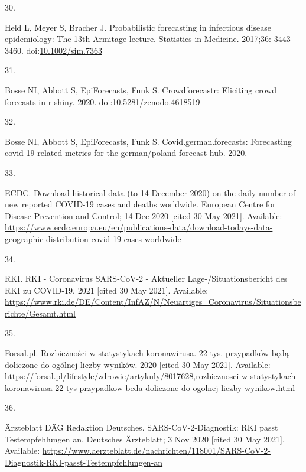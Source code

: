 \documentclass[10pt,letterpaper]{article}
\newlength{\cslhangindent}
\newlength{\csllabelwidth}
\newlength{\cslentryspacingunit} %
\newenvironment{CSLReferences}[2] %
 {%
  \setlength{\parindent}{0pt}
  \ifodd #1
  \let\oldpar\par
  \def\par{\hangindent=\cslhangindent\oldpar}
  \fi
  \setlength{\parskip}{#2\cslentryspacingunit}
 }%
 {}
\newcommand{\CSLLeftMargin}[1]{\parbox[t]{\csllabelwidth}{#1}}
\newcommand{\CSLRightInline}[1]{\parbox[t]{\linewidth - \csllabelwidth}{#1}\break}
\begin{document}
\begin{CSLReferences}{0}{0}
\leavevmode{}%
\CSLLeftMargin{30. }
\CSLRightInline{Held L, Meyer S, Bracher J. Probabilistic forecasting in
infectious disease epidemiology: The 13th {Armitage} lecture. Statistics
in Medicine. 2017;36: 3443--3460.
doi:\href{https://doi.org/10.1002/sim.7363}{10.1002/sim.7363}}

\leavevmode{}%
\CSLLeftMargin{31. }
\CSLRightInline{Bosse NI, Abbott S, EpiForecasts, Funk S.
Crowdforecastr: Eliciting crowd forecasts in r shiny. 2020.
doi:\href{https://doi.org/10.5281/zenodo.4618519}{10.5281/zenodo.4618519}}

\leavevmode{}%
\CSLLeftMargin{32. }
\CSLRightInline{Bosse NI, Abbott S, EpiForecasts, Funk S.
Covid.german.forecasts: Forecasting covid-19 related metrics for the
german/poland forecast hub. 2020. }

\leavevmode{}%
\CSLLeftMargin{33. }
\CSLRightInline{ECDC. Download historical data (to 14 {December} 2020)
on the daily number of new reported {COVID-19} cases and deaths
worldwide. {European Centre for Disease Prevention and Control}; 14 Dec
2020 {[}cited 30 May 2021{]}. Available:
\url{https://www.ecdc.europa.eu/en/publications-data/download-todays-data-geographic-distribution-covid-19-cases-worldwide}}

\leavevmode{}%
\CSLLeftMargin{34. }
\CSLRightInline{RKI. {RKI} - {Coronavirus SARS-CoV-2} - {Aktueller
Lage-}/{Situationsbericht} des {RKI} zu {COVID-19}. 2021 {[}cited 30 May
2021{]}. Available:
\url{https://www.rki.de/DE/Content/InfAZ/N/Neuartiges_Coronavirus/Situationsberichte/Gesamt.html}}

\leavevmode{}%
\CSLLeftMargin{35. }
\CSLRightInline{Forsal.pl. Rozbieżności w statystykach koronawirusa. 22
tys. przypadków będą doliczone do ogólnej liczby wyników. 2020 {[}cited
30 May 2021{]}. Available:
\url{https://forsal.pl/lifestyle/zdrowie/artykuly/8017628,rozbieznosci-w-statystykach-koronawirusa-22-tys-przypadkow-beda-doliczone-do-ogolnej-liczby-wynikow.html}}

\leavevmode{}%
\CSLLeftMargin{36. }
\CSLRightInline{Ärzteblatt DÄG Redaktion Deutsches.
SARS-CoV-2-Diagnostik: RKI passt Testempfehlungen an. {Deutsches
Ärzteblatt}; 3 Nov 2020 {[}cited 30 May 2021{]}. Available:
\url{https://www.aerzteblatt.de/nachrichten/118001/SARS-CoV-2-Diagnostik-RKI-passt-Testempfehlungen-an}}


\end{CSLReferences}
\end{document}
